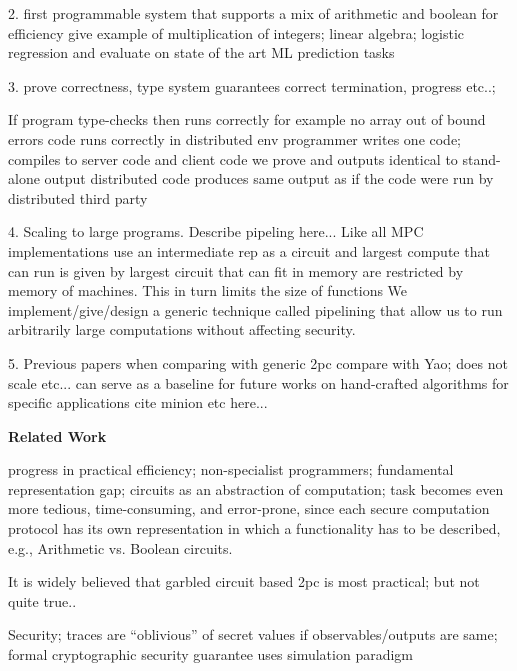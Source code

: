 2. first programmable system that supports a mix of arithmetic and boolean for efficiency give example of multiplication of integers; linear algebra; logistic regression and evaluate on state of the art ML prediction tasks

3. prove correctness, type system guarantees correct termination, progress etc..; 


If program type-checks then runs correctly for example no array out of bound errors
code runs correctly in distributed env
programmer writes one code; compiles to server code and client code
we prove and outputs identical to stand-alone output
distributed code produces same output as if the code were run by distributed third party


4. Scaling to large programs. Describe pipeling here... Like all MPC implementations use an intermediate rep as a circuit and largest compute that can run is given by largest circuit that can fit in memory are restricted by memory of machines. This in turn limits the size of functions 
We implement/give/design a generic technique called pipelining that allow us to run arbitrarily large computations without affecting security.


5. Previous papers when comparing with generic 2pc compare with Yao; does not scale etc...
can serve as a baseline for future works on hand-crafted algorithms for specific applications cite minion etc here...







\noindent\textbf{Related Work}
\cite{lambdaps,wysteria}

 progress in practical efficiency; non-specialist programmers; fundamental representation gap; circuits as an abstraction of computation; task becomes even more tedious, time-consuming, and error-prone,
since each secure computation protocol has its own
representation in which a functionality has to be described, e.g.,
Arithmetic vs. Boolean circuits.

 It is widely believed that garbled circuit based 2pc is most practical; but not quite true..

 Security; traces are ``oblivious'' of secret values if observables/outputs are same; formal cryptographic security guarantee uses simulation paradigm \cite{canetti2000} 


